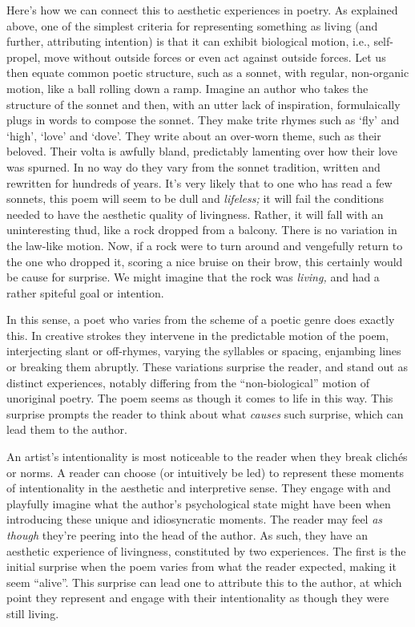 Here's how we can connect this to aesthetic experiences in poetry. As
explained above, one of the simplest criteria for representing something
as living (and further, attributing intention) is that it can exhibit
biological motion, i.e., self-propel, move without outside forces or
even act against outside forces. Let us then equate common poetic
structure, such as a sonnet, with regular, non-organic motion, like a
ball rolling down a ramp. Imagine an author who takes the structure of
the sonnet and then, with an utter lack of inspiration, formulaically
plugs in words to compose the sonnet. They make trite rhymes such as
`fly' and `high', `love' and `dove'. They write about an over-worn
theme, such as their beloved. Their volta is awfully bland, predictably
lamenting over how their love was spurned. In no way do they vary from
the sonnet tradition, written and rewritten for hundreds of years. It's
very likely that to one who has read a few sonnets, this poem will seem
to be dull and \emph{lifeless;} it will fail the conditions needed to
have the aesthetic quality of livingness. Rather, it will fall with an
uninteresting thud, like a rock dropped from a balcony. There is no
variation in the law-like motion. Now, if a rock were to turn around and
vengefully return to the one who dropped it, scoring a nice bruise on
their brow, this certainly would be cause for surprise. We might imagine
that the rock was \emph{living,} and had a rather spiteful goal or
intention.

In this sense, a poet who varies from the scheme of a poetic genre does
exactly this. In creative strokes they intervene in the predictable
motion of the poem, interjecting slant or off-rhymes, varying the
syllables or spacing, enjambing lines or breaking them abruptly. These
variations surprise the reader, and stand out as distinct experiences,
notably differing from the ``non-biological'' motion of unoriginal
poetry. The poem seems as though it comes to life in this way. This
surprise prompts the reader to think about what \emph{causes} such
surprise, which can lead them to the author.

An artist's intentionality is most noticeable to the reader when they
break clichés or norms. A reader can choose (or intuitively be led) to
represent these moments of intentionality in the aesthetic and
interpretive sense. They engage with and playfully imagine what the
author's psychological state might have been when introducing these
unique and idiosyncratic moments. The reader may feel \emph{as though}
they're peering into the head of the author. As such, they have an
aesthetic experience of livingness, constituted by two experiences. The
first is the initial surprise when the poem varies from what the reader
expected, making it seem ``alive''. This surprise can lead one to
attribute this to the author, at which point they represent and engage
with their intentionality as though they were still living.

